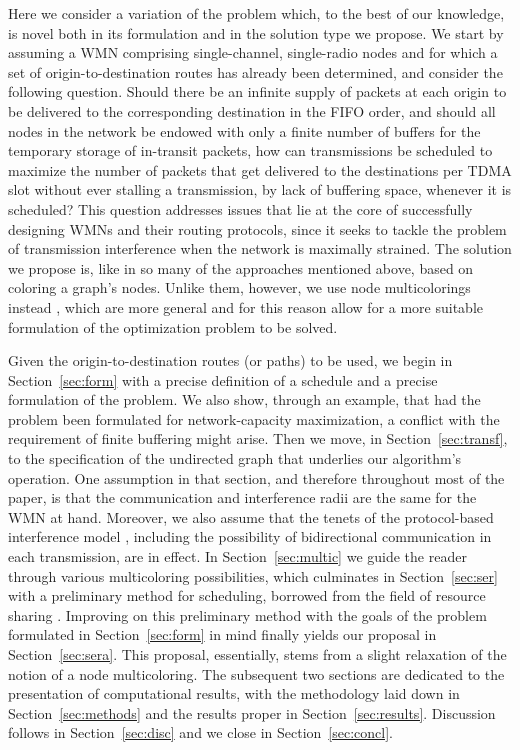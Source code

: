 \documentclass{article}
\begin{document}
Here we consider a variation of the problem which, to the best of our knowledge,
is novel both in its formulation and in the solution type we propose. We start
by assuming a WMN comprising single-channel, single-radio nodes and for which a
set of origin-to-destination routes has already been determined, and consider
the following question. Should there be an infinite supply of packets at each
origin to be delivered to the corresponding destination in the FIFO order, and
should all nodes in the network be endowed with only a finite number of buffers
for the temporary storage of in-transit packets, how can transmissions be
scheduled to maximize the number of packets that get delivered to the
destinations per TDMA slot without ever stalling a transmission, by lack of
buffering space, whenever it is scheduled? This question addresses issues that
lie at the core of successfully designing WMNs and their routing protocols,
since it seeks to tackle the problem of transmission interference when the
network is maximally strained. The solution we propose is, like in so many of
the approaches mentioned above, based on coloring a graph's nodes. Unlike them,
however, we use node multicolorings instead \cite{s76}, which are more general
and for this reason allow for a more suitable formulation of the optimization
problem to be solved.

Given the origin-to-destination routes (or paths) to be used, we begin in
Section~\ref{sec:form} with a precise definition of a schedule and a precise
formulation of the problem. We also show, through an example, that had the
problem been formulated for network-capacity maximization, a conflict with the
requirement of finite buffering might arise. Then we move, in
Section~\ref{sec:transf}, to the specification of the undirected graph that
underlies our algorithm's operation. One assumption in that section, and
therefore throughout most of the paper, is that the communication and
interference radii are the same for the WMN at hand. Moreover, we also assume
that the tenets of the protocol-based interference model \cite{br03,shlk09},
including the possibility of bidirectional communication in each transmission,
are in effect. In Section~\ref{sec:multic} we guide the reader through various
multicoloring possibilities, which culminates in Section~\ref{sec:ser} with a
preliminary method for scheduling, borrowed from the field of resource sharing
\cite{b96}. Improving on this preliminary method with the goals of the problem
formulated in Section~\ref{sec:form} in mind finally yields our proposal in
Section~\ref{sec:sera}. This proposal, essentially, stems from a slight
relaxation of the notion of a node multicoloring. The subsequent two sections
are dedicated to the presentation of computational results, with the methodology
laid down in Section~\ref{sec:methods} and the results proper in
Section~\ref{sec:results}. Discussion follows in Section~\ref{sec:disc} and we
close in Section~\ref{sec:concl}.
\end{document}
